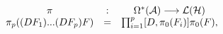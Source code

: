 \begin{equation}\label{PIREP}
\begin{array}{ccc}
  \pi &:& \Omega^*({\cal A}) \longrightarrow {\cal L}({\cal
  H}) \\
   \pi_p((DF_1)...(DF_p)F) &=& \prod_{i=1}^p [D, \pi_0(F_i)]
   \pi_0(F),
\end{array}
\end{equation}

